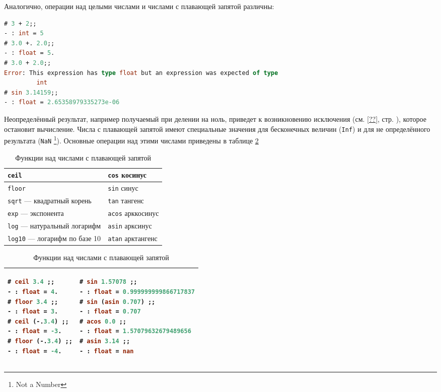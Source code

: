 Аналогично, операции над целыми числами и числами с плавающей запятой различны:

\begin{lstlisting}[language=OCaml]
# 3 + 2;;
- : int = 5
# 3.0 +. 2.0;;
- : float = 5.
# 3.0 + 2.0;;
Error: This expression has type float but an expression was expected of type
         int
# sin 3.14159;;
- : float = 2.65358979335273e-06
\end{lstlisting}

Неопределённый результат, например получаемый при делении на ноль, приведет к
возникновению исключения (см. \ref{??}, стр. \pageref{??}), которое остановит
вычисление. Числа с плавающей запятой имеют специальные значения для бесконечных
величин (\texttt{Inf}) и для не определённого результата (\texttt{NaN}
\footnote{Not a Number}). Основные операции над этими числами приведены в
таблице \ref{tbl:functions_on_floats}

\begin{table}[hl]
\begin{center}
	\label{tbl:functions_on_floats}
	\caption{Функции над числами с плавающей запятой}
	\begin{tabular}{|p{7.2cm}|p{7.2cm}|}
	\hline
	\texttt{ceil} & \texttt{cos} косинус \\
	\hline
	\texttt{floor} & \texttt{sin} синус \\
	\hline
	\texttt{sqrt} --- квадратный корень & \texttt{tan} тангенс \\
	\hline
	\texttt{exp} --- экспонента & \texttt{acos} арккосинус \\
	\hline
	\texttt{log} --- натуральный логарифм & \texttt{asin} арксинус \\
	\hline
	\texttt{log10} --- логарифм по базе 10 & \texttt{atan} арктангенс \\
	\hline
	\end{tabular}
	\begin{tabular}{|p{7.2cm}|p{7.2cm}|}
	\hline
{\begin{lstlisting}[language=OCaml,frame=none]
# ceil 3.4 ;;
- : float = 4.
# floor 3.4 ;;
- : float = 3.
# ceil (-.3.4) ;;
- : float = -3.
# floor (-.3.4) ;;
- : float = -4.
\end{lstlisting}}
 &
{\begin{lstlisting}[language=OCaml,frame=none]
# sin 1.57078 ;;
- : float = 0.999999999866717837
# sin (asin 0.707) ;;
- : float = 0.707
# acos 0.0 ;;
- : float = 1.57079632679489656
# asin 3.14 ;;
- : float = nan
\end{lstlisting}}
\\
	\hline
	\end{tabular}
\end{center}
\end{table}


